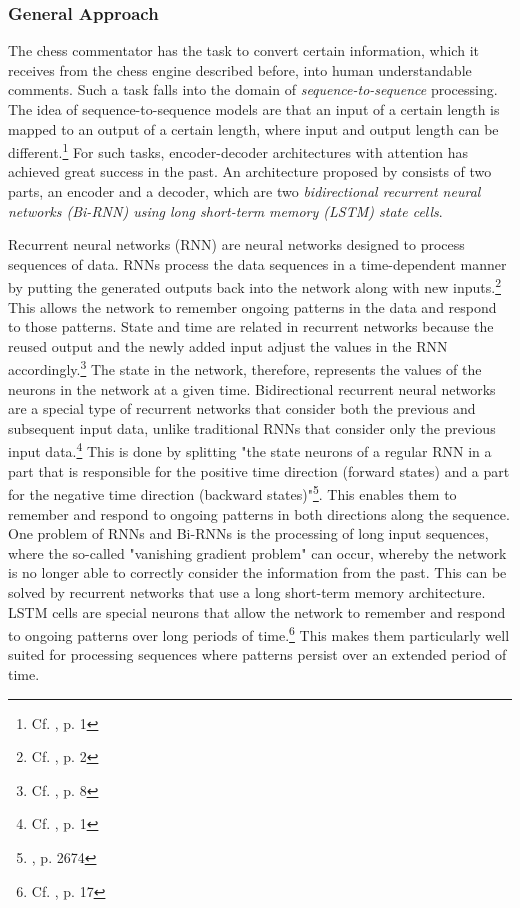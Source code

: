 \subsubsection{General Approach}

The chess commentator has the task to convert certain information, which it receives from the chess engine described before, into human understandable comments. Such a task falls into the domain of \textit{sequence-to-sequence} processing. The idea of sequence-to-sequence models are that an input of a certain length is mapped to an output of a certain length, where input and output length can be different.\footnote{Cf. \cite{Sutskever-2014-sts}, p. 1} For such tasks, encoder-decoder architectures with attention has achieved great success in the past. An architecture proposed by \cite{zang-etal-2019-automated} consists of two parts, an encoder and a decoder, which are two \textit{bidirectional recurrent neural networks (Bi-RNN) using long short-term memory (LSTM) state cells}.

Recurrent neural networks (RNN) are neural networks designed to process sequences of data. RNNs process the data sequences in a time-dependent manner by putting the generated outputs back into the network along with new inputs.\footnote{Cf. \cite{rnn-2015-review}, p. 2} This allows the network to remember ongoing patterns in the data and respond to those patterns. State and time are related in recurrent networks because the reused output and the newly added input adjust the values in the RNN accordingly.\footnote{Cf. \cite{rnn-2015-review}, p. 8} The state in the network, therefore, represents the values of the neurons in the network at a given time. Bidirectional recurrent neural networks are a special type of recurrent networks that consider both the previous and subsequent input data, unlike traditional RNNs that consider only the previous input data.\footnote{Cf. \cite{https://doi.org/10.48550/arxiv.1801.01078}, p. 1} This is done by splitting "the state neurons of a regular RNN in a part that is responsible for the positive time direction (forward states) and a part for the negative time direction (backward states)"\footnote{\cite{Schuster1997BidirectionalRN}, p. 2674}. This enables them to remember and respond to ongoing patterns in both directions along the sequence. One problem of RNNs and Bi-RNNs is the processing of long input sequences, where the so-called "vanishing gradient problem" can occur, whereby the network is no longer able to correctly consider the information from the past. This can be solved by recurrent networks that use a long short-term memory architecture. LSTM cells are special neurons that allow the network to remember and respond to ongoing patterns over long periods of time.\footnote{Cf. \cite{rnn-2015-review}, p. 17} This makes them particularly well suited for processing sequences where patterns persist over an extended period of time.

